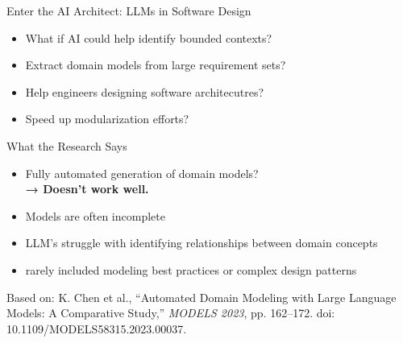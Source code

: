 \documentclass[aspectratio=169,12pt]{beamer}
\begin{document}
\begin{frame}{Enter the AI Architect: LLMs in Software Design}
\begin{itemize}
    \item What if AI could help identify bounded contexts?
    \item Extract domain models from large requirement sets?
    \item Help engineers designing software architecutres?
    \item Speed up modularization efforts?
\end{itemize}
\end{frame}

\begin{frame}{What the Research Says}
    \begin{itemize}
        \item Fully automated generation of domain models? \\
        \textbf{→ Doesn't work well.}
        
        \item Models are often incomplete
        \item LLM's struggle with identifying relationships between domain concepts
        \item rarely included modeling best practices or complex design patterns
    \end{itemize}
    \vspace{0.5cm}
    \tiny{
        Based on: K. Chen et al., “Automated Domain Modeling with Large Language Models: A Comparative Study,”
        \textit{MODELS 2023}, pp. 162–172. doi: 10.1109/MODELS58315.2023.00037.
    }
\end{frame}
\end{document}
